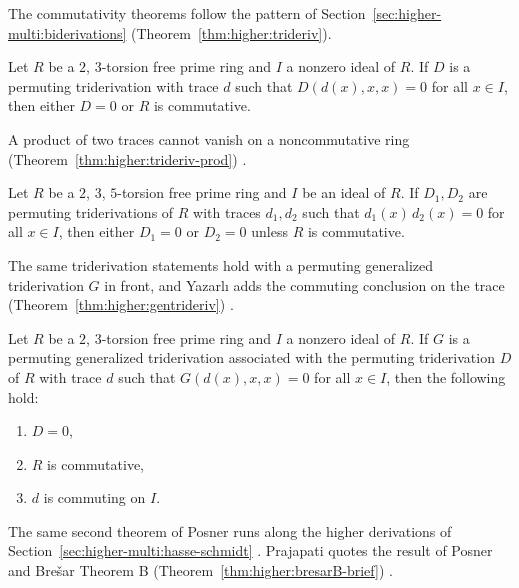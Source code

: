 The commutativity theorems follow the pattern of
Section~\ref{sec:higher-multi:biderivations}
\cite[p.~490]{Yazarli2017Trideriv} (Theorem~\ref{thm:higher:trideriv}).

\begin{theorem}\label{thm:higher:trideriv}
Let $R$ be a $2$, $3$-torsion free prime ring and $I$ a nonzero ideal of
$R$. If $D$ is a permuting triderivation with trace $d$ such that
$D(d(x),x,x)=0$ for all $x\in I$, then either $D=0$ or $R$ is commutative.
\end{theorem}

A product of two traces cannot vanish on a noncommutative ring (Theorem~\ref{thm:higher:trideriv-prod})
\cite[p.~492]{Yazarli2017Trideriv}.\begin{theorem}\label{thm:higher:trideriv-prod}
Let $R$ be a $2$, $3$, $5$-torsion free prime ring and $I$ be an ideal of
$R$. If $D_1,D_2$ are permuting triderivations of $R$ with traces $d_1,d_2$
such that $d_1(x)\,d_2(x)=0$ for all $x\in I$, then either $D_1=0$ or
$D_2=0$ unless $R$ is commutative.
\end{theorem}

The same triderivation statements hold with a permuting generalized
triderivation $G$ in front, and Yazarlı adds the commuting conclusion on the
trace (Theorem~\ref{thm:higher:gentrideriv})
\cite[p.~494]{Yazarli2017Trideriv}.

\begin{theorem}\label{thm:higher:gentrideriv}
Let $R$ be a $2$, $3$-torsion free prime ring and $I$ a nonzero ideal of
$R$. If $G$ is a permuting generalized triderivation associated with the
permuting triderivation $D$ of $R$ with trace $d$ such that
$G(d(x),x,x)=0$ for all $x\in I$, then the following hold:
\begin{enumerate}
\item $D=0$,
\item $R$ is commutative,
\item $d$ is commuting on $I$.
\end{enumerate}
\end{theorem}

The same second theorem of Posner runs along the higher derivations of
Section~\ref{sec:higher-multi:hasse-schmidt}
\cite[p.~4]{Prajapati2021}. Prajapati quotes the result of Posner and Brešar
Theorem B (Theorem~\ref{thm:higher:bresarB-brief}) \cite[p.~4]{Prajapati2021}.

